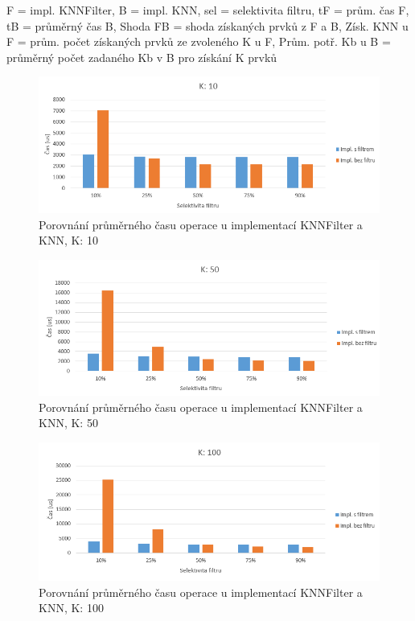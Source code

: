 \documentclass[czech,semestral,dept460,male,csharp,cpdeclaration]{diploma}
\begin{document}
\begin{center}
			{\footnotesize *F = impl. KNNFilter, B = impl. KNN, sel = selektivita filtru, tF = prům. čas F, tB = průměrný čas B, Shoda FB = shoda získaných prvků z F a B, Získ. KNN u F = prům. počet získaných prvků ze zvoleného K u F, Prům. potř. Kb u B = průměrný počet zadaného Kb v B pro získání K prvků}\\
			
			
		\end{center}
		
		\label{graf_filtr_all}
		\begin{figure}
			\centering
			\includegraphics[scale=0.8]{Figures/graf_filtr_k10.png}
			\caption{Porovnání průměrného času operace u implementací KNNFilter a KNN, K: 10}
			\label{graf_filtr_k10}
		\end{figure}
	
		\begin{figure}
			\centering
			\includegraphics[scale=0.8]{Figures/graf_filtr_k50.png}
			\caption{Porovnání průměrného času operace u implementací KNNFilter a KNN, K: 50}
			\label{graf_filtr_k50}
		\end{figure}
	
		\begin{figure}
			\centering
			\includegraphics[scale=0.8]{Figures/graf_filtr_k100.png}
			\caption{Porovnání průměrného času operace u implementací KNNFilter a KNN, K: 100}
			\label{graf_filtr_k100}
		\end{figure}
	
\end{document}
